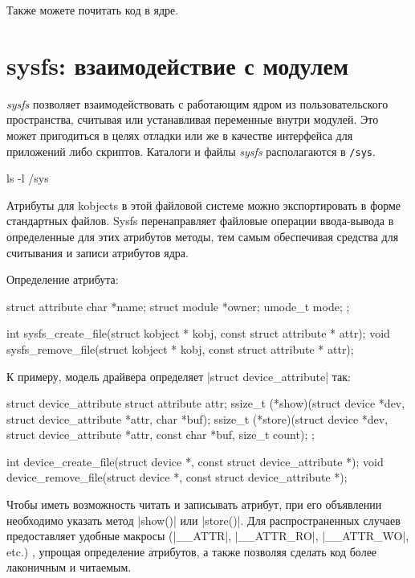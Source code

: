 \documentclass[10pt, oneside]{book}
\begin{document}
Также можете почитать код  в ядре.

\section{sysfs: взаимодействие с модулем}
\label{sec:sysfs}
\emph{sysfs} позволяет взаимодействовать с работающим ядром из пользовательского пространства, считывая или устанавливая переменные внутри модулей. Это может пригодиться в целях отладки или же в качестве интерфейса для приложений либо скриптов. Каталоги и файлы \emph{sysfs} располагаются в \verb|/sys|.

\begin{codebash}
ls -l /sys
\end{codebash}

Атрибуты для kobjects в этой файловой системе можно экспортировать в форме стандартных файлов. Sysfs перенаправляет файловые операции ввода-вывода в
определенные для этих атрибутов методы, тем самым обеспечивая средства для считывания и записи атрибутов ядра.

Определение атрибута:

\begin{code}
struct attribute {
    char *name;
    struct module *owner;
    umode_t mode;
};

int sysfs_create_file(struct kobject * kobj, const struct attribute * attr);
void sysfs_remove_file(struct kobject * kobj, const struct attribute * attr);
\end{code}

К примеру, модель драйвера определяет \cpp|struct device_attribute| так:

\begin{code}
struct device_attribute {
    struct attribute attr;
    ssize_t (*show)(struct device *dev, struct device_attribute *attr,
                    char *buf);
    ssize_t (*store)(struct device *dev, struct device_attribute *attr,
                    const char *buf, size_t count);
};

int device_create_file(struct device *, const struct device_attribute *);
void device_remove_file(struct device *, const struct device_attribute *);
\end{code}

Чтобы иметь возможность читать и записывать атрибут, при его объявлении необходимо
указать метод \cpp|show()| или \cpp|store()|.
Для распространенных случаев  предоставляет удобные макросы (\cpp|__ATTR|, \cpp|__ATTR_RO|, \cpp|__ATTR_WO|, etc.) , упрощая определение атрибутов, а также позволяя сделать код более лаконичным и читаемым.
\end{document}
